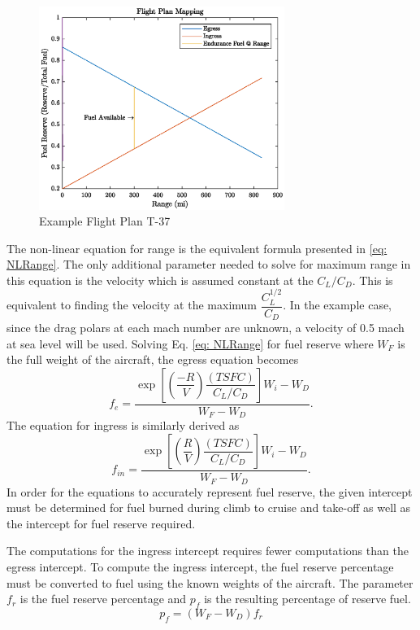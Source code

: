 \begin{figure} 
    \centering
    \includegraphics[width = 8cm]{Thesis/Method/ExampleFlightT37.eps}
    \caption{Example Flight Plan T-37}
    \label{fig:exT37}
\end{figure}
The non-linear equation for range is the equivalent formula presented in \ref{eq: NLRange}. The only additional parameter needed to solve for maximum range in this equation is the velocity which is assumed constant at the $C_L/C_D$. This is equivalent to finding the velocity at the maximum $\dfrac{C_L^{1/2}}{C_D}$. In the example case, since the drag polars at each mach number are unknown, a velocity of 0.5 mach at sea level will be used. Solving Eq. \ref{eq: NLRange} for fuel reserve where $W_F$ is the full weight of the aircraft, the egress equation becomes
\begin{equation}
    f_e = \dfrac{\exp\left[\left(\dfrac{-R}{V}\right)\dfrac{(TSFC)}{C_L/C_D}\right]W_i-W_D}{W_F - W_D}.
    \label{eq: NLEgressEq}
\end{equation}
The equation for ingress is similarly derived as 
\begin{equation}
    f_{in} =\dfrac{\exp\left[\left(\dfrac{R}{V}\right)\dfrac{(TSFC)}{C_L/C_D}\right]W_i-W_D}{W_F - W_D}.
    \label{eq: NLIngressEq}
\end{equation}
In order for the equations to accurately represent fuel reserve, the given intercept must be determined for fuel burned during climb to cruise and take-off as well as the intercept for fuel reserve required.\par
The computations for the ingress intercept requires fewer computations than the egress intercept. To compute the ingress intercept, the fuel reserve percentage must be converted to fuel using the known weights of the aircraft. The parameter $f_r$ is the fuel reserve percentage and $p_f$ is the resulting percentage of reserve fuel.
\begin{equation*}
    p_f = (W_F - W_D)f_r
\end{equation*}
